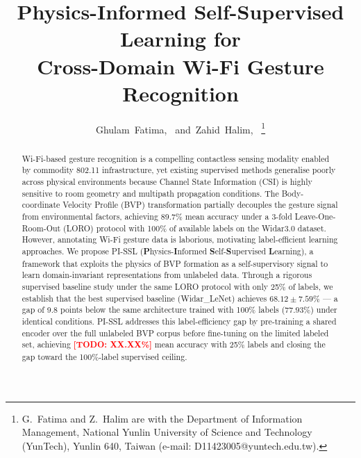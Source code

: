 \documentclass[journal]{IEEEtran}
\newcommand{\todo}[1]{\textcolor{red}{\textbf{[TODO: #1]}}}
\begin{document}

\title{Physics-Informed Self-Supervised Learning for\\
Cross-Domain Wi-Fi Gesture Recognition}

\author{Ghulam~Fatima,~
        and~Zahid~Halim,~%
\thanks{G.~Fatima and Z.~Halim are with the Department of Information
Management, National Yunlin University of Science and Technology (YunTech),
Yunlin 640, Taiwan (e-mail: D11423005@yuntech.edu.tw).}}

\maketitle

\begin{abstract}
Wi-Fi-based gesture recognition is a compelling contactless sensing
modality enabled by commodity 802.11 infrastructure, yet existing
supervised methods generalise poorly across physical environments
because Channel State Information (CSI) is highly sensitive to room
geometry and multipath propagation conditions.
The Body-coordinate Velocity Profile (BVP) transformation partially
decouples the gesture signal from environmental factors, achieving
89.7\% mean accuracy under a 3-fold Leave-One-Room-Out (LORO)
protocol with 100\% of available labels on the Widar3.0 dataset.
However, annotating Wi-Fi gesture data is laborious, motivating
label-efficient learning approaches.
We propose PI-SSL (\textbf{P}hysics-\textbf{I}nformed
\textbf{S}elf-\textbf{S}upervised \textbf{L}earning), a framework
that exploits the physics of BVP formation as a self-supervisory
signal to learn domain-invariant representations from unlabeled data.
Through a rigorous supervised baseline study under the same LORO
protocol with only 25\% of labels, we establish that the best
supervised baseline (Widar\_LeNet) achieves $68.12 \pm 7.59\%$ ---
a gap of 9.8 points below the same architecture trained with 100\%
labels ($77.93\%$) under identical conditions.
PI-SSL addresses this label-efficiency gap by pre-training a shared
encoder over the full unlabeled BVP corpus before fine-tuning on
the limited labeled set, achieving \todo{XX.XX\%} mean accuracy
with 25\% labels and closing the gap toward the 100\%-label
supervised ceiling.
\end{abstract}
\end{document}
